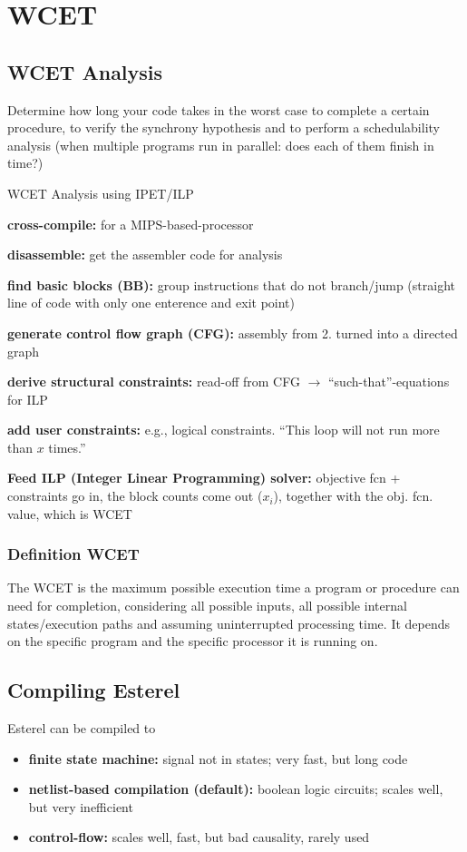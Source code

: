 \documentclass[german]{latex4ei/latex4ei_sheet}
\begin{document}
\section{WCET}
\begin{sectionbox}
\subsection{WCET Analysis}
Determine how long your code takes in the worst case to complete a certain procedure, to verify the synchrony hypothesis and to perform a schedulability analysis (when multiple programs run in parallel: does each of them finish in time?)

\begin{cookbox}{WCET Analysis using IPET/ILP}
\item \textbf{cross-compile:} for a MIPS-based-processor
\item \textbf{disassemble:} get the assembler code for analysis
\item \textbf{find basic blocks (BB):} group instructions that do not branch/jump (straight line of code with only one enterence and exit point)
\item \textbf{generate control flow graph (CFG):} assembly from 2. turned into a directed graph
\item \textbf{derive structural constraints:} read-off from CFG $\rightarrow$ "`such-that"'-equations for ILP
\item \textbf{add user constraints:} e.g., logical constraints. "`This loop will not run more than $x$ times."'
\item \textbf{Feed ILP (Integer Linear Programming) solver:} objective fcn + constraints go in, the block counts come out ($x_i$), together with the obj. fcn. value, which is WCET
\end{cookbox}

\subsubsection{Definition WCET}
The WCET is the maximum possible execution time a program or procedure can need for completion, considering all possible inputs, all possible internal states/execution paths and assuming uninterrupted processing time. It depends on the specific program and the specific processor it is running on.

\subsection{Compiling Esterel}
Esterel can be compiled to
\begin{itemize}
\item \textbf{finite state machine:} signal not in states; very fast, but long code
\item \textbf{netlist-based compilation (default):} boolean logic circuits; scales well, but very inefficient
\item \textbf{control-flow:} scales well, fast, but bad causality, rarely used
\end{itemize}


\end{sectionbox}
\end{document}
